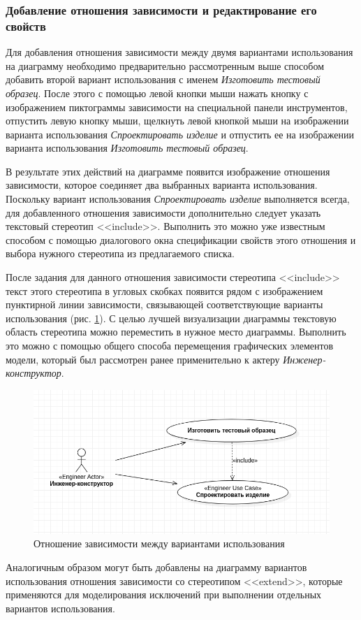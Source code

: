 \documentclass[a4paper,12pt]{extreport}
\begin{document}
\subsubsection*{Добавление отношения зависимости и редактирование его свойств}
Для добавления отношения зависимости между двумя вариантами использования на диаграмму необходимо предварительно рассмотренным выше способом добавить второй вариант использования с именем \textit{Изготовить тестовый образец}. После этого с помощью левой кнопки мыши нажать кнопку с изображением пиктограммы зависимости на специальной панели инструментов, отпустить левую кнопку мыши, щелкнуть левой кнопкой мыши на изображении варианта использования \textit{Спроектировать изделие} и отпустить ее на изображении варианта использования \textit{Изготовить тестовый образец}. 

В результате этих действий на диаграмме появится изображение отношения зависимости, которое соединяет два выбранных варианта использования.
Поскольку вариант использования \textit{Спроектировать изделие} выполняется всегда, для добавленного отношения зависимости дополнительно следует указать текстовый стереотип <<include>>. Выполнить это можно уже известным способом с помощью диалогового окна спецификации свойств этого отношения и выбора нужного стереотипа из предлагаемого списка.

После задания для данного отношения зависимости стереотипа <<include>> текст этого стереотипа в угловых скобках появится рядом с изображением пунктирной линии зависимости, связывающей соответствующие варианты использования (рис. \ref{fig:actionsinclude}). С целью лучшей визуализации диаграммы текстовую область стереотипа можно переместить в нужное место диаграммы. Выполнить это можно с помощью общего способа перемещения графических элементов модели, который был рассмотрен ранее применительно к актеру \textit{Инженер-конструктор}.
\newpage
\begin{figure}[h!]
	\centering
	\includegraphics[width=0.7\linewidth]{images/actionsinclude}
	\caption{Отношение зависимости между вариантами использования}
	\label{fig:actionsinclude}
\end{figure}
Аналогичным образом могут быть добавлены на диаграмму вариантов использования отношения зависимости со стереотипом <<extend>>, которые применяются для моделирования исключений при выполнении отдельных вариантов использования.
\end{document}
